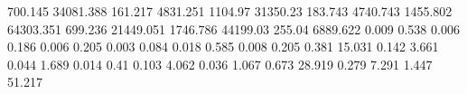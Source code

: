 700.145    34081.388  %
161.217    4831.251   %
1104.97    31350.23   %
183.743    4740.743   %
1455.802   64303.351  %
699.236    21449.051  %
1746.786   44199.03   %
255.04     6889.622   %
0.009      0.538      %
0.006      0.186      %
0.006      0.205      %
0.003      0.084      %
0.018      0.585      %
0.008      0.205      %
0.381      15.031     %
0.142      3.661      %
0.044      1.689      %
0.014      0.41       %
0.103      4.062      %
0.036      1.067      %
0.673      28.919     %
0.279      7.291      %
1.447      51.217     %
